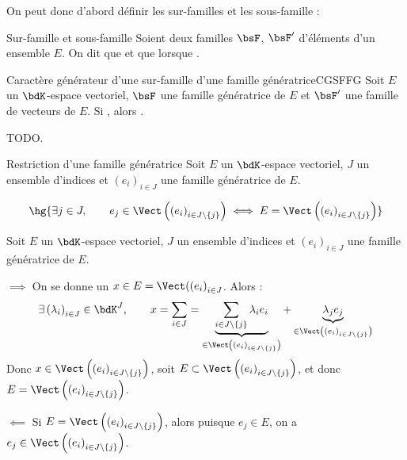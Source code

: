 \documentclass[a4paper,french,bookmarks]{article}
\begin{document}
On peut donc d'abord définir les sur-familles et les sous-famille :

\begin{definition}{Sur-famille et sous-famille}{}
    Soient deux familles $\bsF$, $\bsF'$ d'éléments d'un ensemble $E$. On dit que  et que  lorsque .
\end{definition}

\begin{property}{Caractère générateur d'une sur-famille d'une famille génératrice}{CGSFFG}
    Soit $E$ un $\bdK$-espace vectoriel, $\bsF$ une famille génératrice de $E$ et $\bsF'$ une famille de vecteurs de $E$. Si , alors .
\end{property}

\begin{nproof}
    TODO.
\end{nproof}

\begin{property}{Restriction d'une famille génératrice}{}
    Soit $E$ un $\bdK$-espace vectoriel, $J$ un ensemble d'indices et $(e_i)_{i \in J}$ une famille génératrice de $E$.
    
    \[ \hg{\exists j \in J,\qquad e_j \in \Vect\left(\left(e_i\right)_{i \in J \backslash \{ j \}}\right) \iff E = \Vect\left(\left(e_i\right)_{i \in J \backslash \{ j \}}\right)} \]
\end{property}

\begin{nproof}
    Soit $E$ un $\bdK$-espace vectoriel, $J$ un ensemble d'indices et $(e_i)_{i \in J}$ une famille génératrice de $E$.
    
    \begin{enumerate}
        \itt $\boxed{\implies}$ On se donne un $x \in E =  \Vect(\left(e_i\right)_{i \in J}$. Alors :
        \[ \exists \left(\lambda_i\right)_{i \in J} \in \bdK^J,\qquad x = \sum_{i \in J} = \underbrace{\sum_{i \in J \backslash \{j\}} \lambda_i e_i}_{\in \Vect\left(\left(e_i\right)_{i \in J \backslash \{ j \}}\right)} + \underbrace{\lambda_{j}e_j}_{\in \Vect\left(\left(e_i\right)_{i \in J \backslash \{ j \}}\right)}\]
        Donc $x \in \Vect\left(\left(e_i\right)_{i \in J \backslash \{ j \}}\right)$, soit $E \subset \Vect\left(\left(e_i\right)_{i \in J \backslash \{ j \}}\right)$, et donc $E = \Vect\left(\left(e_i\right)_{i \in J \backslash \{ j \}}\right)$.
        
        \itt $\boxed{\impliedby}$ Si $E = \Vect\left(\left(e_i\right)_{i \in J \backslash \{ j \}}\right)$, alors puisque $e_j \in E$, on a $e_j \in \Vect\left(\left(e_i\right)_{i \in J \backslash \{ j \}}\right)$.
    \end{enumerate}
\end{nproof}
\end{document}
